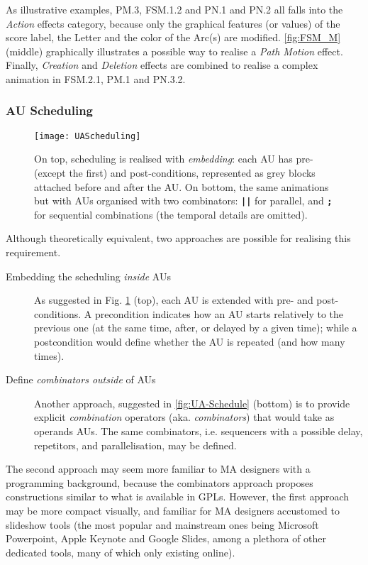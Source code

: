 As illustrative examples, \textsf{PM.3}, \textsf{FSM.1.2} and \textsf{PN.1} and \textsf{PN.2}
all falls into the \emph{Action} effects category, because only the graphical 
features (or values) of the score label, the \textsf{Letter} and the color of the
\textsf{Arc}(s) are modified. \autoref{fig:FSM_M} (middle) graphically illustrates
a possible way to realise a \emph{Path Motion} effect. Finally,
\emph{Creation} and \emph{Deletion} effects are combined to realise a complex 
animation in \textsf{FSM.2.1}, \textsf{PM.1} and \textsf{PN.3.2}. 

\subsubsection{AU Scheduling}
\label{sec:MA-Scheduling}

\begin{figure}[t]%
   \centering
   \texttt{[image: UAScheduling]}%
   \caption{On top, scheduling is realised with \emph{embedding}: each AU has 
   pre- (except the first) and post-conditions, represented as grey blocks attached 
   before and after the AU. On bottom, the same animations but with AUs organised with
   two combinators: \texttt{\textbf{||}} for parallel, and \texttt{\textbf{;}} for
   sequential combinations (the temporal details are omitted).
   }%
   \label{fig:UA-Schedule}%
\end{figure}

Although theoretically equivalent, two approaches are possible for realising
this requirement.
\begin{description}
   \item[Embedding the scheduling \emph{inside} AUs] As suggested in 
   Fig. \ref{fig:UA-Schedule} (top), each AU is extended with pre- and 
   post-conditions. A precondition indicates how an AU starts relatively to the 
   previous one (at the same time, after, or delayed by a given time); while a
   postcondition would define whether the AU is repeated (and how many times).
   
   \item[Define \emph{combinators outside} of AUs] Another approach, suggested
   in \autoref{fig:UA-Schedule} (bottom) is to provide explicit \emph{combination}
   operators (aka. \emph{combinators}) that would take as operands AUs. The same
   combinators, i.e. sequencers with a possible delay, repetitors, and 
   parallelisation, may be defined.
\end{description}
The second approach may seem more familiar to MA designers with a programming 
background, because the combinators approach proposes constructions similar to
what is available in GPLs. However, the first approach may be more compact visually,
and familiar for MA designers accustomed to slideshow tools (the most popular and
mainstream ones being Microsoft Powerpoint, Apple Keynote and Google Slides, among
a plethora of other dedicated tools, many of which only existing online).

